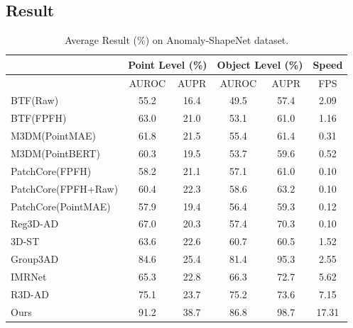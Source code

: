 \subsection{Result}


\begin{table}[ht]
\centering
\caption{Average Result (\%) on Anomaly-ShapeNet dataset.}
\label{tab:ShapeNet}
\begin{tabular}{l|cc|cc|c}
\hline
& \multicolumn{2}{c|}{Point Level (\%)} & \multicolumn{2}{c|}{Object Level (\%)} & Speed \\
\hline
& AUROC & AUPR & AUROC & AUPR & FPS \\ 
\hline
BTF(Raw)                            & 55.2 & 16.4  & 49.5 & 57.4  & 2.09 \\ 
BTF(FPFH)                           & 63.0 & 21.0  & 53.1 & 61.0  & 1.16 \\ 
M3DM(PointMAE)                      & 61.8 & 21.5  & 55.4 & 61.4  & 0.31 \\ 
M3DM(PointBERT)                     & 60.3 & 19.5  & 53.7 & 59.6  & 0.52 \\ 
PatchCore(FPFH)                     & 58.2 & 21.1  & 57.1 & 61.0  & 0.10 \\ 
PatchCore(FPFH+Raw)                 & 60.4 & 22.3  & 58.6 & 63.2  & 0.10 \\ 
PatchCore(PointMAE)                 & 57.9 & 19.4  & 56.4 & 59.3  & 0.12 \\ 
Reg3D-AD \cite{liu2023real3d}       & 67.0 & 20.3  & 57.4 & 70.3  & 0.10 \\ 
3D-ST \cite{bergmann2023anomaly}    & 63.6 & 22.6  & 60.7 & 60.5  & 1.52 \\
Group3AD \cite{zhu2024towards}      & 84.6 & 25.4  & 81.4 & 95.3  & 2.55 \\ 
IMRNet \cite{li2024towards}         & 65.3 & 22.8  & 66.3 & 72.7  & 5.62 \\
R3D-AD \cite{zhou2024r3d}           & 75.1 & 23.7  & 75.2 & 73.6  & 7.15 \\
Ours                                & 91.2 & 38.7  & 86.8 & 98.7  & 17.31 \\
\hline
\end{tabular}
\end{table}




